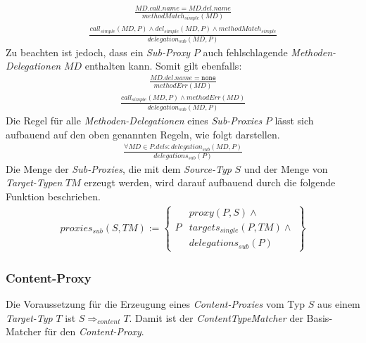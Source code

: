 \begin{gather*}
\frac{\mathit{MD.call.name} = \mathit{MD.del.name}}
{\mathit{methodMatch_{simple}(MD)}}
\end{gather*}
\begin{gather*}
\frac{\mathit{call_{simple}(MD, P)} \wedge \mathit{del_{simple}(MD, P)} \wedge \mathit{methodMatch_{simple}}}
{\mathit{delegation_{sub}(MD, P)}}
\end{gather*}
\noindent
Zu beachten ist jedoch, dass ein \emph{Sub-Proxy} $P$ auch fehlschlagende \emph{Methoden-Delegationen} $\mathit{MD}$ enthalten kann. Somit gilt ebenfalls:
\begin{gather*}
\frac{ \mathit{MD.del.name} = \texttt{none}}
{\mathit{methodErr(MD)}}
\end{gather*}
\begin{gather*}
\frac{\mathit{call_{simple}(MD, P)} \wedge \mathit{methodErr(MD)}}
{\mathit{delegation_{sub}(MD, P)}}
\end{gather*}
\noindent
Die Regel für alle \emph{Methoden-Delegationen} eines \emph{Sub-Proxies} $P$ lässt sich aufbauend auf den oben genannten Regeln, wie folgt darstellen.
\begin{gather*}
\frac{\forall \mathit{MD} \in P.dels: \mathit{delegation_{sub}(MD,P)}}
{\mathit{delegations_{sub}(P)}}
\end{gather*}
\noindent
Die Menge der \emph{Sub-Proxies}, die mit dem \emph{Source-Typ} $S$ und der Menge von \emph{Target-Typen} $\mathit{TM}$ erzeugt werden, wird darauf aufbauend durch die folgende Funktion beschrieben.
\begin{gather*}
\mathit{proxies_{sub}(S,\mathit{TM})} := 
\left\{\begin{array}{l|l}
		& \mathit{proxy(P,S)}\wedge \mathit{ } \\
	P	& \mathit{targets_{single}(P,\mathit{TM})} \wedge \mathit{ } \\
		& \mathit{delegations_{sub}(P)}
		 \end{array}
\right\}
\end{gather*}
\subsubsection{Content-Proxy}
Die Voraussetzung für die Erzeugung eines \emph{Content-Proxies} vom Typ $S$ aus einem \emph{Target-Typ} $T$ ist $S \Rightarrow_{content} T$. Damit ist der \emph{ContentTypeMatcher} der Basis-Matcher für den \emph{Content-Proxy}.

